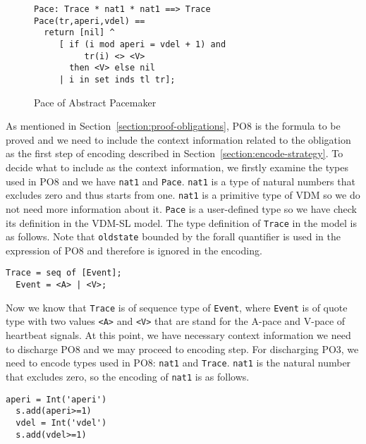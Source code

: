 \begin{figure}[t]
\begin{center}
\begin{mdframed}[roundcorner=5pt]
\begin{Verbatim}[fontsize=\small]
Pace: Trace * nat1 * nat1 ==> Trace
Pace(tr,aperi,vdel) ==
  return [nil] ^
     [ if (i mod aperi = vdel + 1) and
          tr(i) <> <V> 
       then <V> else nil
     | i in set inds tl tr];
\end{Verbatim}
\end{mdframed}
\vspace{-10pt}
\caption{Pace of Abstract Pacemaker}
\label{fig:pace_case1}
\end{center}
\end{figure}

As mentioned in Section~\ref{section:proof-obligations}, PO8 is the formula to be proved and we need to include the context information related to the obligation as the first step of encoding described in Section~\ref{section:encode-strategy}. To decide what to include as the context information, we firstly examine the types used in PO8 and we have {\tt nat1} and {\tt Pace}. {\tt nat1} is a type of natural numbers that excludes zero and thus starts from one. {\tt nat1} is a primitive type of VDM so we do not need more information about it. {\tt Pace} is a user-defined type so we have check its definition in the VDM-SL model. The type definition of {\tt Trace} in the model is as follows. Note that {\tt oldstate} bounded by the forall quantifier is used in the expression of PO8 and therefore is ignored in the encoding.

\begin{mdframed}[roundcorner=5pt]
\begin{Verbatim}[fontsize=\small]
  Trace = seq of [Event];
  Event = <A> | <V>;
\end{Verbatim}
\end{mdframed}

Now we know that {\tt Trace} is of sequence type of {\tt Event}, where {\tt Event} is of quote type with two values {\tt <A>} and {\tt <V>} that are stand for the A-pace and V-pace of heartbeat signals. At this point, we have necessary context information we need to discharge PO8 and we may proceed to encoding step. For discharging PO3, we need to encode types used in PO8: {\tt nat1} and {\tt Trace}. {\tt nat1} is the natural number that excludes zero, so the encoding of {\tt nat1} is as follows. 

\begin{mdframed}[roundcorner=5pt,shadow=true]
\begin{Verbatim}[fontsize=\small]
  aperi = Int('aperi')
  s.add(aperi>=1)
  vdel = Int('vdel')
  s.add(vdel>=1)
\end{Verbatim}
\end{mdframed}

